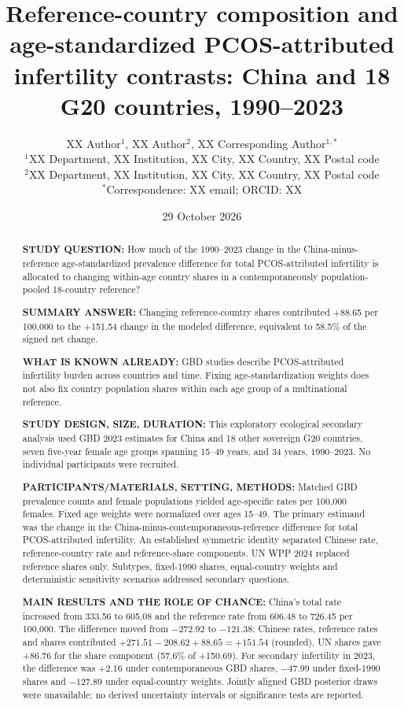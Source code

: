 \documentclass[11pt,a4paper]{article}
\title{Reference-country composition and age-standardized PCOS-attributed infertility contrasts: China and 18 G20 countries, 1990--2023}
\author{XX Author$^{1}$, XX Author$^{2}$, XX Corresponding Author$^{1,*}$\\
{\small $^{1}$XX Department, XX Institution, XX City, XX Country, XX Postal code}\\
{\small $^{2}$XX Department, XX Institution, XX City, XX Country, XX Postal code}\\
{\small $^{*}$Correspondence: XX email; ORCID: XX}}
\date{29 October 2026}
\begin{document}
\maketitle\thispagestyle{fancy}
\linenumbers
\begingroup\sloppy
\begin{abstract}
\noindent\textbf{STUDY QUESTION:} How much of the 1990--2023 change in the China-minus-reference age-standardized prevalence difference for total PCOS-attributed infertility is allocated to changing within-age country shares in a contemporaneously population-pooled 18-country reference?

\noindent\textbf{SUMMARY ANSWER:} Changing reference-country shares contributed +88.65 per 100,000 to the +151.54 change in the modeled difference, equivalent to 58.5\% of the signed net change.

\noindent\textbf{WHAT IS KNOWN ALREADY:} GBD studies describe PCOS-attributed infertility burden across countries and time. Fixing age-standardization weights does not also fix country population shares within each age group of a multinational reference.

\noindent\textbf{STUDY DESIGN, SIZE, DURATION:} This exploratory ecological secondary analysis used GBD 2023 estimates for China and 18 other sovereign G20 countries, seven five-year female age groups spanning 15--49 years, and 34 years, 1990--2023. No individual participants were recruited.

\noindent\textbf{PARTICIPANTS/MATERIALS, SETTING, METHODS:} Matched GBD prevalence counts and female populations yielded age-specific rates per 100,000 females. Fixed age weights were normalized over ages 15--49. The primary estimand was the change in the China-minus-contemporaneous-reference difference for total PCOS-attributed infertility. An established symmetric identity separated Chinese rate, reference-country rate and reference-share components. UN WPP 2024 replaced reference shares only. Subtypes, fixed-1990 shares, equal-country weights and deterministic sensitivity scenarios addressed secondary questions.

\noindent\textbf{MAIN RESULTS AND THE ROLE OF CHANCE:} China's total rate increased from 333.56 to 605.08 and the reference rate from 606.48 to 726.45 per 100,000. The difference moved from $-272.92$ to $-121.38$: Chinese rates, reference rates and shares contributed $+271.51-208.62+88.65=+151.54$ (rounded). UN shares gave +86.76 for the share component (57.6\% of +150.69). For secondary infertility in 2023, the difference was +2.16 under contemporaneous GBD shares, $-47.99$ under fixed-1990 shares and $-127.89$ under equal-country weights. Jointly aligned GBD posterior draws were unavailable; no derived uncertainty intervals or significance tests are reported.


\end{abstract}
\end{document}
